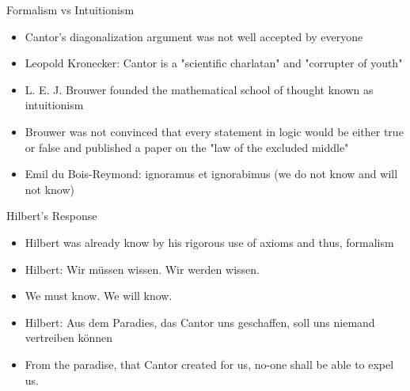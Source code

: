\documentclass[utf8]{beamer}
\begin{document}
\begin{frame}{Formalism vs Intuitionism}
\begin{itemize}
\item Cantor's diagonalization argument was not well accepted by everyone
\item Leopold Kronecker: Cantor is a "scientific charlatan" and "corrupter of youth"
\item L. E. J. Brouwer founded the mathematical school of thought known as intuitionism
\item Brouwer was not convinced that every statement in logic would be either true or false and published a paper on the "law of the excluded middle"
\item Emil du Bois-Reymond: ignoramus et ignorabimus (we do not know and will not know)
\end{itemize}
\end{frame}

\begin{frame}{Hilbert's Response}
\begin{itemize}
\item Hilbert was already know by his rigorous use of axioms and thus, formalism
\item Hilbert: Wir müssen wissen. Wir werden wissen.
\item We must know. We will know.
\item Hilbert: Aus dem Paradies, das Cantor uns geschaffen, soll uns niemand vertreiben k{\"o}nnen
\item From the paradise, that Cantor created for us, no-one shall be able to expel us.
\end{itemize}
\end{frame}
\end{document}
